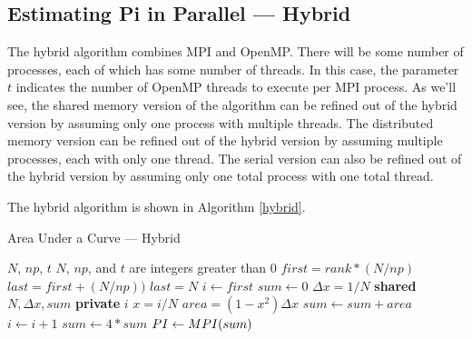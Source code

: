 \documentclass[a4paper, 11pt]{article}
\begin{document}

\subsection{Estimating Pi in Parallel --- Hybrid}

The hybrid algorithm combines MPI and OpenMP. There will be some number of processes, each of which has some number of threads. In this case, the parameter $t$ indicates the number of OpenMP threads to execute per MPI process. As we'll see, the shared memory version of the algorithm can be refined out of the hybrid version by assuming only one process with multiple threads. The distributed memory version can be refined out of the hybrid version by assuming multiple processes, each with only one thread. The serial version can also be refined out of the hybrid version by assuming only one total process with one total thread.

The hybrid algorithm is shown in Algorithm \ref{hybrid}.

\begin{algorithm}
\caption{Area Under a Curve --- Hybrid}
\label{hybrid}
\begin{algorithmic}
\Require $N$, $np$, $t$
\Ensure $N$, $np$, and $t$ are integers greater than 0
\State {} 
\State {} 
\State $first = rank * (N / np)$ 
\State $last = first + (N / np))$ 
 
\State $last = N$ 
\EndIf
\State $i\gets first$ 
\State $sum\gets 0$ 
\State $\Delta x = 1 / N$ 
 
\State \textbf{shared} $N, \Delta x, sum$ 
\State \textbf{private} $i$ 
 
\State $x = i / N$ 
\State $area = (1 - x^2) \Delta x$ 
\State $sum \gets sum + area$ 
\State $i\gets i + 1$ 
\EndWhile
\EndOMP
\State $sum \gets 4 * sum$ 
\State $PI\gets \Call{$MPI$}{sum}$ 
\end{algorithmic}
\end{algorithm}
\end{document}
